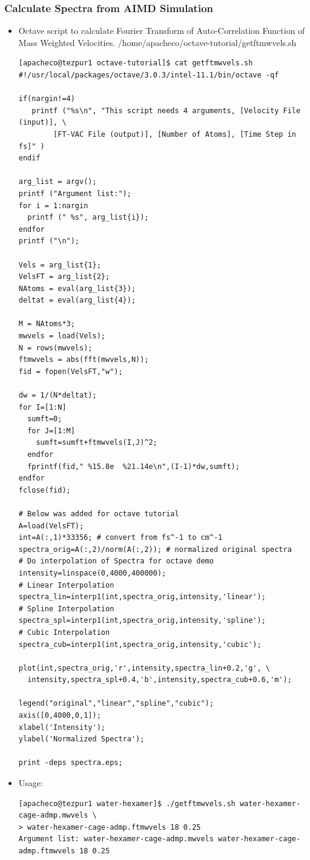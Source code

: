 \documentclass[t,compress,xcolor=svgnames]{beamer}
\begin{document}
\begin{frame}
  \frametitle{\small Calculate Spectra from AIMD Simulation}
  \begin{itemize}
    \item Octave script to calculate Fourier Transform of Auto-Correlation Function of Mass Weighted Velocities. /home/apacheco/octave-tutorial/getftmwvels.sh
  {\tiny
    \begin{verbatim}
[apacheco@tezpur1 octave-tutorial]$ cat getftmwvels.sh
#!/usr/local/packages/octave/3.0.3/intel-11.1/bin/octave -qf

if(nargin!=4)
   printf ("%s\n", "This script needs 4 arguments, [Velocity File (input)], \
        [FT-VAC File (output)], [Number of Atoms], [Time Step in fs]" )
endif

arg_list = argv();
printf ("Argument list:");
for i = 1:nargin
  printf (" %s", arg_list{i});
endfor
printf ("\n");

Vels = arg_list{1};
VelsFT = arg_list{2};
NAtoms = eval(arg_list{3});
deltat = eval(arg_list{4});

M = NAtoms*3;
mwvels = load(Vels);
N = rows(mwvels);
ftmwvels = abs(fft(mwvels,N));
fid = fopen(VelsFT,"w");

dw = 1/(N*deltat);
for I=[1:N]
  sumft=0;
  for J=[1:M]
    sumft=sumft+ftmwvels(I,J)^2;
  endfor
  fprintf(fid," %15.8e  %21.14e\n",(I-1)*dw,sumft);
endfor
fclose(fid);

# Below was added for octave tutorial
A=load(VelsFT);
int=A(:,1)*33356; # convert from fs^-1 to cm^-1
spectra_orig=A(:,2)/norm(A(:,2)); # normalized original spectra
# Do interpolation of Spectra for octave demo
intensity=linspace(0,4000,400000);
# Linear Interpolation
spectra_lin=interp1(int,spectra_orig,intensity,'linear');
# Spline Interpolation
spectra_spl=interp1(int,spectra_orig,intensity,'spline');
# Cubic Interpolation
spectra_cub=interp1(int,spectra_orig,intensity,'cubic');

plot(int,spectra_orig,'r',intensity,spectra_lin+0.2,'g', \
  intensity,spectra_spl+0.4,'b',intensity,spectra_cub+0.6,'m');

legend("original","linear","spline","cubic");
axis([0,4000,0,1]);
xlabel('Intensity');
ylabel('Normalized Spectra');

print -deps spectra.eps;
    \end{verbatim}
  }
  \item Usage: 
  {\tiny
    \begin{verbatim}
[apacheco@tezpur1 water-hexamer]$ ./getftmwvels.sh water-hexamer-cage-admp.mwvels \
> water-hexamer-cage-admp.ftmwvels 18 0.25
Argument list: water-hexamer-cage-admp.mwvels water-hexamer-cage-admp.ftmwvels 18 0.25


\end{verbatim}}
\end{itemize}
\end{frame}
\end{document}
